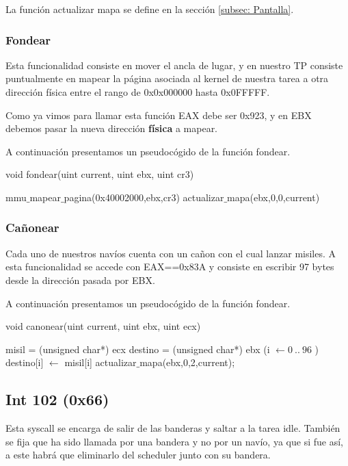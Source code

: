 \par{La función actualizar mapa se define en la sección \ref{subsec: Pantalla}.}

\subsubsection{Fondear}
\par{Esta funcionalidad consiste en mover el ancla de lugar, y en nuestro TP consiste puntualmente en mapear la página asociada al kernel de nuestra tarea a otra dirección física entre el rango de 0x0x000000 hasta 0x0FFFFF.}
\par{Como ya vimos para llamar esta función EAX debe ser 0x923, y en EBX debemos pasar la nueva dirección \textbf{física} a mapear.}
\par{A continuación presentamos un pseudocógido de la función fondear.}

\begin{algorithm}[h!]
\caption{void fondear(uint current, uint ebx, uint cr3)}
\begin{algorithmic}
	\State mmu$\_$mapear$\_$pagina(0x40002000,ebx,cr3)
	\State actualizar$\_$mapa(ebx,0,0,current)
\end{algorithmic}
\end{algorithm}
\subsubsection{Cañonear}
\par{Cada uno de nuestros navíos cuenta con un cañon con el cual lanzar misiles. A esta funcionalidad se accede con EAX==0x83A y consiste en escribir 97 bytes desde la dirección pasada por EBX.}
\par{A continuación presentamos un pseudocógido de la función fondear.}

\begin{algorithm}[h!]
\caption{void canonear(uint current, uint ebx, uint ecx)}
\begin{algorithmic}
	\State misil = (unsigned char*) ecx
	\State destino = (unsigned char*) ebx
	\For (i $\gets 0~..~96$ )
	\State destino[i] $\gets$ misil[i]
	\EndFor
	\State actualizar$\_$mapa(ebx,0,2,current);
\end{algorithmic}
\end{algorithm}


	
\subsection{Int 102 (0x66)}
\par{Esta syscall se encarga de salir de las banderas y saltar a la tarea idle. También se fija que ha sido llamada por una bandera y no por un navío, ya que si fue así, a este habrá que eliminarlo del scheduler junto con su bandera.}